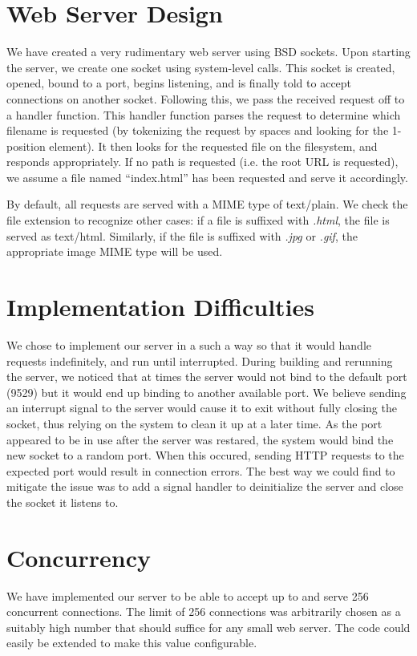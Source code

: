 \documentclass[12pt]{article}
\begin{document}
\maketitle

\section{Web Server Design}
We have created a very rudimentary web server using BSD sockets. Upon starting the server, we create one socket using system-level calls. This socket is created, opened, bound to a port, begins listening, and is finally told to accept connections on another socket. Following this, we pass the received request off to a handler function. This handler function parses the request to determine which filename is requested (by tokenizing the request by spaces and looking for the 1-position element). It then looks for the requested file on the filesystem, and responds appropriately. If no path is requested (i.e. the root URL is requested), we assume a file named ``index.html'' has been requested and serve it accordingly.

By default, all requests are served with a MIME type of text/plain. We check the file extension to recognize other cases: if a file is suffixed with \emph{.html}, the file is served as text/html. Similarly, if the file is suffixed with \emph{.jpg} or \emph{.gif}, the appropriate image MIME type will be used.

\section{Implementation Difficulties}
We chose to implement our server in a such a way so that it would handle requests indefinitely, and run until interrupted. During building and rerunning the server, we noticed that at times the server would not bind to the default port (9529) but it would end up binding to another available port. We believe sending an interrupt signal to the server would cause it to exit without fully closing the socket, thus relying on the system to clean it up at a later time. As the port appeared to be in use after the server was restared, the system would bind the new socket to a random port. When this occured, sending HTTP requests to the expected port would result in connection errors. The best way we could find to mitigate the issue was to add a signal handler to deinitialize the server and close the socket it listens to.

\section{Concurrency}
We have implemented our server to be able to accept up to and serve 256 concurrent connections. The limit of 256 connections was arbitrarily chosen as a suitably high number that should suffice for any small web server. The code could easily be extended to make this value configurable.
\end{document}
